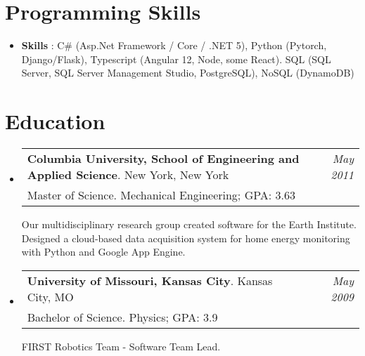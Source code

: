 \documentclass[letterpaper,11pt]{article}
\makeatletter
\newcommand{\resumeSubheading}[4]{
  \vspace{-2pt} %
  \item
    \begin{tabular*}{0.97\textwidth}{l@{\extracolsep{\fill}}r}
      \textbf{#1}. #2 & \textit{\small#4} \\
       {\small #3} \\

    \end{tabular*}
    \vspace{-5pt}
}
\newcommand{\resumeSubHeadingListStart}{\begin{itemize}[leftmargin=*]}
\newcommand{\resumeSubHeadingListEnd}{\end{itemize}}
\makeatother
\begin{document}
\section{Programming Skills}
  \resumeSubHeadingListStart
   \item{
     \textbf{Skills }{: C\# (Asp.Net Framework / Core / .NET 5), Python (Pytorch, Django/Flask), Typescript (Angular 12, Node, some React).
     SQL (SQL Server, SQL Server Management Studio, PostgreSQL), NoSQL (DynamoDB) }
   }
  \resumeSubHeadingListEnd

\section{Education}
\resumeSubHeadingListStart
  \resumeSubheading
    {Columbia University, School of Engineering and Applied Science}{New York, New York}
    {Master of Science. Mechanical Engineering;  GPA: 3.63}{May 2011}
    {Our multidisciplinary research group created software for the Earth Institute. Designed a cloud-based data acquisition system for home energy monitoring with Python and Google App Engine.}
    \resumeSubheading
    {University of Missouri, Kansas City}{Kansas City, MO}
    {Bachelor of Science. Physics;  GPA: 3.9}{May 2009}
    {FIRST Robotics Team - Software Team Lead.}
    \resumeSubHeadingListEnd


%


\end{document}
